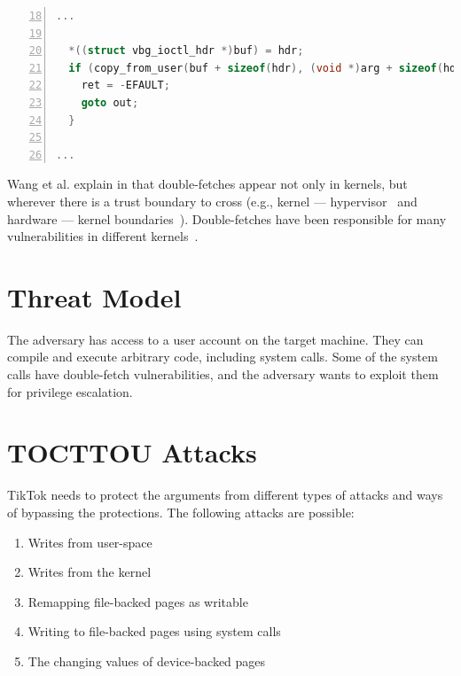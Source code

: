 \documentclass[conference]{IEEEtran}
\newcommand{\sysname}{TikTok}
\begin{document}
\begin{lstlisting}[language=C, caption=CVE-2018-12633 Double Fetch Fix,
  label=code:cvedoublefetchfix,  breaklines=true
  postbreak=\mbox{\textcolor{red}{$\hookrightarrow$}\space},
  numbers=left,basicstyle=\scriptsize, firstnumber=18, xleftmargin=5.0ex]
...

  *((struct vbg_ioctl_hdr *)buf) = hdr;
  if (copy_from_user(buf + sizeof(hdr), (void *)arg + sizeof(hdr), hdr.size_in - sizeof(hdr))) {
    ret = -EFAULT;
    goto out;
  }

...

\end{lstlisting}

Wang et al. explain in \cite{wang2018survey} that double-fetches appear not only
in kernels, but wherever there is a trust boundary to cross (e.g., kernel ---
hypervisor~\cite{wilhelm2016xenpwn} and hardware --- kernel
boundaries~\cite{lu2018untrusted}). Double-fetches have been responsible for many
vulnerabilities in different kernels~\cite{jurczyk2013bochspwn, wang2018survey}.


\section{Threat Model}
\label{sec:threatmodel}
The adversary has access to a user account on the target machine. They can compile
and execute arbitrary code, including system calls. Some of the system calls
have double-fetch vulnerabilities, and the adversary wants to exploit them for
privilege escalation.

\section{TOCTTOU Attacks}

\sysname{} needs to protect the arguments from different types of attacks and ways of
bypassing the protections. The following attacks are possible:

\begin{enumerate}
  \item \label{first} Writes from user-space
  \item \label{second} Writes from the kernel
  \item \label{third} Remapping file-backed pages as writable
  \item \label{fourth} Writing to file-backed pages using system calls
  \item \label{fifth} The changing values of device-backed pages
\end{enumerate}
\end{document}
